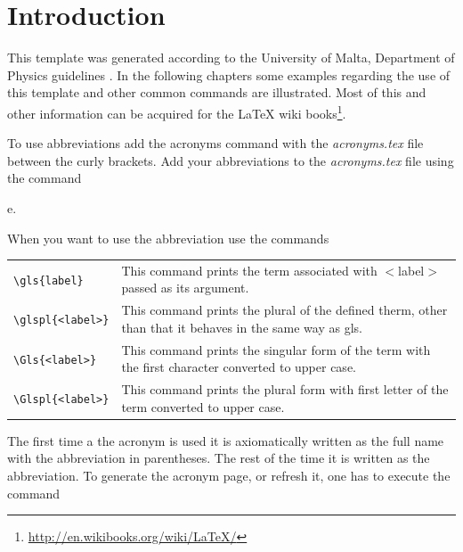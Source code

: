 

\frontmatter %

\chapter{Introduction}

This template was generated according to the University of Malta, Department of Physics guidelines \cite{guidelines}. In the following chapters some examples regarding the use of this template and other common commands are illustrated. Most of this and other information can be acquired for the \LaTeX{} wiki books\footnote{\url{http://en.wikibooks.org/wiki/LaTeX/}}.

To use abbreviations add the acronyms command with the \textit{acronyms.tex} file between the curly brackets. Add your abbreviations to the \textit{acronyms.tex} file using the command
\begin{code}
e.\alpha
{}
\end{code}
When you want to use the abbreviation use the commands

\begin{table}[h!]
\center
\begin{tabular}{l p{11cm}}
\verb|\gls{label}| & This command prints the term associated with $<$label$>$ passed as its argument.\\
\verb|\glspl{<label>}| & This command prints the plural of the defined therm, other than that it behaves in the same way as gls.\\
\verb|\Gls{<label>}| & This command prints the singular form of the term with the first character converted to upper case.\\
\verb|\Glspl{<label>}| & This command prints the plural form with first letter of the term converted to upper case.\\
\end{tabular}
\end{table}

The first time a the acronym is used it is axiomatically written as the full name with the abbreviation in parentheses. The rest of the time it is written as the abbreviation. To generate the acronym page, or refresh it, one has to execute the command


